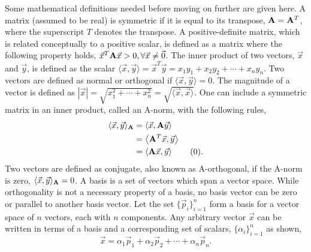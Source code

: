 \documentclass[11pt,letterpaper,oneside,notitlepage]{article}	%
\newcommand{\bfa}{{\bf A}}						%
\newcommand{\ip}[2]{\langle \vec #1,\vec #2 \rangle}	%
\newcommand{\aip}[2]{\langle \vec #1,\bfa\vec #2 \rangle}	%
\newcommand{\yestag}{\tag{\theequation}\stepcounter{equation}}	%
\numberwithin{equation}{section}				%
\begin{document}
Some mathematical definitions needed before moving on further are given here. A matrix (assumed to be real) is symmetric if it is equal to its transpose, $\bfa = \bfa^T$, where the superscript $T$ denotes the transpose. A positive-definite matrix, which is related conceptually to a positive scalar, is defined as a matrix where the following property holds, $\vec x^T \bfa \vec x >0, \forall \vec x \neq \vec 0$. The inner product of two vectors, $\vec x$ and $\vec y$, is defined as the scalar $\ip{x}{y}= \vec x^T \vec y = x_1 y_1 + x_2 y_2 + \cdots + x_n y_n$. Two vectors are defined as normal or orthogonal if $\ip{x}{y} = 0$. The magnitude of a vector is defined as $|\vec x|=\sqrt{x_1^2+\cdots+x_n^2}=\sqrt{\ip{x}{x}}$. One can include a symmetric matrix in an inner product, called an A-norm, with the following rules, 
\begin{align*}
\ip{x}{y}_\bfa &= \aip{x}{y} \\
&= \left \langle \bfa^T\vec x,\vec y \right \rangle \\
&= \left \langle \bfa \vec x,\vec y \right \rangle \yestag
.\end{align*}
Two vectors are defined as conjugate, also known as A-orthogonal, if the A-norm is zero, $\ip{x}{y}_\bfa = 0$. A basis is a set of vectors which span a vector space. While orthogonality is not a necessary property of a basis, no basis vector can be zero or parallel to another basis vector. Let the set $\{\vec p_i\}_{i=1}^n$ form a basis for a vector space of $n$ vectors, each with $n$ components. Any arbitrary vector $\vec x$ can be written in terms of a basis and a corresponding set of scalars, $\{ \alpha_i\}_{i=1}^n$ as shown,
\begin{equation} \vec x = \alpha_1 \vec p_1 + \alpha_2 \vec p_2 + \cdots + \alpha_n \vec p_n \label{Basis} .\end{equation}

\end{document}
